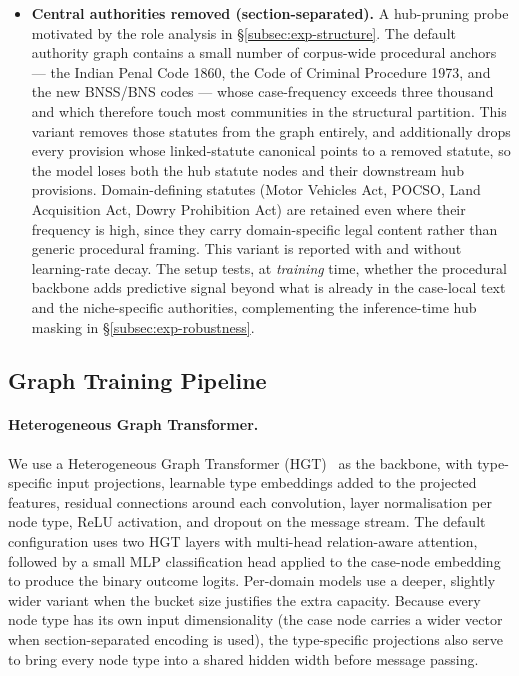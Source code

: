\documentclass[runningheads]{llncs}
\begin{document}
\begin{itemize}[leftmargin=*]
    \item \textbf{Central authorities removed (section-separated).} A hub-pruning probe motivated by the role analysis in \S\ref{subsec:exp-structure}. The default authority graph contains a small number of corpus-wide procedural anchors --- the Indian Penal Code 1860, the Code of Criminal Procedure 1973, and the new BNSS/BNS codes --- whose case-frequency exceeds three thousand and which therefore touch most communities in the structural partition. This variant removes those statutes from the graph entirely, and additionally drops every provision whose linked-statute canonical points to a removed statute, so the model loses both the hub statute nodes and their downstream hub provisions. Domain-defining statutes (Motor Vehicles Act, POCSO, Land Acquisition Act, Dowry Prohibition Act) are retained even where their frequency is high, since they carry domain-specific legal content rather than generic procedural framing. This variant is reported with and without learning-rate decay. The setup tests, at \emph{training} time, whether the procedural backbone adds predictive signal beyond what is already in the case-local text and the niche-specific authorities, complementing the inference-time hub masking in \S\ref{subsec:exp-robustness}.
\end{itemize}

\subsection{Graph Training Pipeline}
\label{subsec:pipeline-training}

\paragraph{Heterogeneous Graph Transformer.}
We use a Heterogeneous Graph Transformer (HGT)~\cite{hu2020heterogeneous} as the backbone, with type-specific input projections, learnable type embeddings added to the projected features, residual connections around each convolution, layer normalisation per node type, ReLU activation, and dropout on the message stream. The default configuration uses two HGT layers with multi-head relation-aware attention, followed by a small MLP classification head applied to the case-node embedding to produce the binary outcome logits. Per-domain models use a deeper, slightly wider variant when the bucket size justifies the extra capacity. Because every node type has its own input dimensionality (the case node carries a wider vector when section-separated encoding is used), the type-specific projections also serve to bring every node type into a shared hidden width before message passing.
\end{document}
